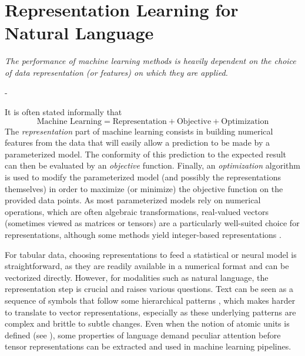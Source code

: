 \chapter{Representation Learning for Natural Language}
\label{sec:rw_repl_nl}

\begin{center}
  \begin{minipage}{0.7\textwidth}
    \textit{The performance of machine learning methods is heavily
dependent on the choice of data representation (or
features) on which they are applied.} 
\begin{flushright}- \citet{bengio_repr} \end{flushright}
  \end{minipage}
\end{center}

It is often stated informally that 
$$
\text{Machine Learning} = \text{Representation} + \text{Objective} + \text{Optimization}
$$
The \textit{representation} part of machine learning consists in building numerical features from the data that will easily allow a prediction to be made by a parameterized model. The conformity of this prediction to the expected result can then be evaluated by an \textit{objective} function. Finally, an \textit{optimization} algorithm is used to modify the parameterized model (and possibly the representations themselves) in order to maximize (or minimize) the objective function on the provided data points. As most parameterized models rely on numerical operations, which are often algebraic transformations, real-valued vectors (sometimes viewed as matrices or tensors) are a particularly well-suited choice for representations, although some methods yield integer-based representations \citep{10.5555/3295222.3295378}.

For tabular data, choosing representations to feed a statistical or neural model is straightforward, as they are readily available in a numerical format and can be vectorized directly. However, for modalities such as natural language, the representation step is crucial and raises various questions. Text can be seen as a sequence of symbols that follow some hierarchical patterns \citep{longacre}, which makes harder to translate to vector representations, especially as these underlying patterns are complex and brittle to subtle changes. Even when the notion of atomic units is defined (see ), some properties of language demand peculiar attention before tensor representations can be extracted and used in machine learning pipelines.

